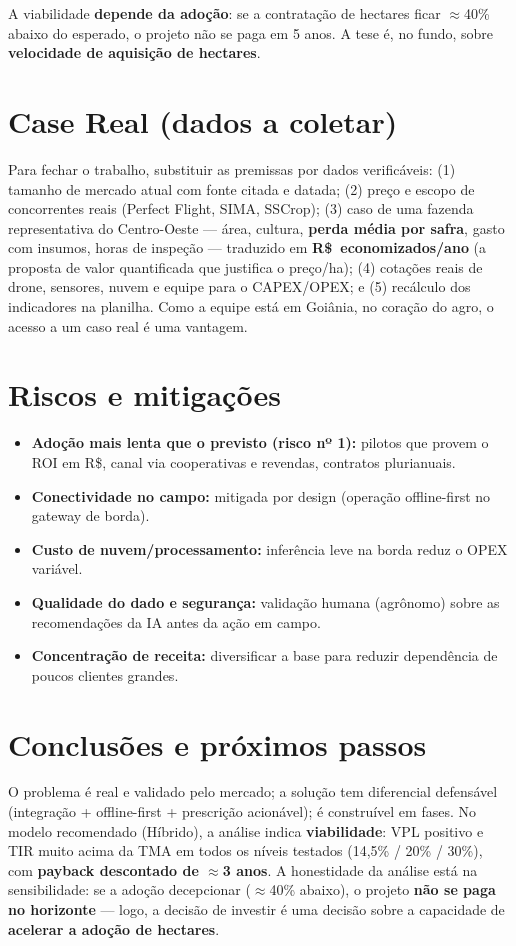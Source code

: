 \documentclass[12pt,a4paper]{article}
\newcommand{\rs}{R\$}
\begin{document}
A viabilidade \textbf{depende da adoção}: se a contratação de hectares ficar $\approx$40\% abaixo do esperado, o projeto não se paga em 5 anos. A tese é, no fundo, sobre \textbf{velocidade de aquisição de hectares}.

\section{Case Real (dados a coletar)}
Para fechar o trabalho, substituir as premissas por dados verificáveis: (1) tamanho de mercado atual com fonte citada e datada; (2) preço e escopo de concorrentes reais (Perfect Flight, SIMA, SSCrop); (3) caso de uma fazenda representativa do Centro-Oeste --- área, cultura, \textbf{perda média por safra}, gasto com insumos, horas de inspeção --- traduzido em \textbf{\rs~economizados/ano} (a proposta de valor quantificada que justifica o preço/ha); (4) cotações reais de drone, sensores, nuvem e equipe para o CAPEX/OPEX; e (5) recálculo dos indicadores na planilha. Como a equipe está em Goiânia, no coração do agro, o acesso a um caso real é uma vantagem.

\section{Riscos e mitigações}
\begin{itemize}
\item \textbf{Adoção mais lenta que o previsto (risco nº 1):} pilotos que provem o ROI em \rs, canal via cooperativas e revendas, contratos plurianuais.
\item \textbf{Conectividade no campo:} mitigada por design (operação offline-first no gateway de borda).
\item \textbf{Custo de nuvem/processamento:} inferência leve na borda reduz o OPEX variável.
\item \textbf{Qualidade do dado e segurança:} validação humana (agrônomo) sobre as recomendações da IA antes da ação em campo.
\item \textbf{Concentração de receita:} diversificar a base para reduzir dependência de poucos clientes grandes.
\end{itemize}

\section{Conclusões e próximos passos}
O problema é real e validado pelo mercado; a solução tem diferencial defensável (integração + offline-first + prescrição acionável); é construível em fases. No modelo recomendado (Híbrido), a análise indica \textbf{viabilidade}: VPL positivo e TIR muito acima da TMA em todos os níveis testados (14,5\% / 20\% / 30\%), com \textbf{payback descontado de $\approx$3 anos}. A honestidade da análise está na sensibilidade: se a adoção decepcionar ($\approx$40\% abaixo), o projeto \textbf{não se paga no horizonte} --- logo, a decisão de investir é uma decisão sobre a capacidade de \textbf{acelerar a adoção de hectares}.
\end{document}
